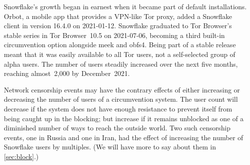 \documentclass[letterpaper,twocolumn]{article}
\begin{document}
Snowflake's growth began in earnest
when it became part of default installations.
Orbot, a mobile app that provides a VPN-like Tor proxy,
added a Snowflake client in version 16.4.0
on \mbox{2021-01-12}.
Snowflake graduated to Tor Browser's stable series
in Tor Browser~10.5
on \mbox{2021-07-06},
becoming a third built-in circumvention option
alongside meek and obfs4.
Being part of a stable release meant that it was
easily available to all Tor users,
not a self-selected group of alpha users.
The number of users steadily increased
over the next five months,
reaching almost~2,000 by December~2021.

Network censorship events may have the contrary effects
of either increasing or decreasing the number of users
of a circumvention system.
The user count will decrease
if the system does not have enough resistance to prevent
itself from being caught up in the blocking;
but increase if it remains unblocked as one
of a diminished number of ways to reach the outside world.
Two such censorship events,
one in Russia and one in Iran,
had the effect of increasing the number of Snowflake users
by multiples.
(We will have more to say about them in \autoref{sec:block}.)
\end{document}
